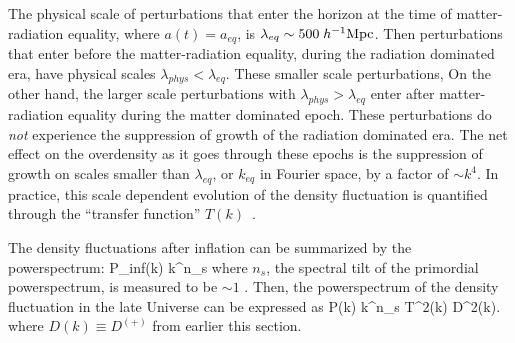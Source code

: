 The physical scale of perturbations that enter the horizon at the time of 
matter-radiation equality, where $a(t) = a_{eq}$, is $\lambda_{eq} \sim 500\;h^{-1}{\rm Mpc}$.
Then perturbations that enter before the matter-radiation equality, during 
the radiation dominated era, have physical scales $\lambda_{phys} < \lambda_{eq}$. 
These smaller scale perturbations,  
On the other hand, the larger scale perturbations with $\lambda_{phys} > \lambda_{eq}$
enter after matter-radiation equality during the matter dominated epoch. These 
perturbations do {\em not} experience the suppression of growth of the radiation 
dominated era. The net effect on the overdensity as it goes through these epochs 
is the suppression of growth on scales smaller than $\lambda_{eq}$, or $k_{eq}$ in 
Fourier space, by a factor of $\sim k^4$. In practice, this scale dependent 
evolution of the density fluctuation is quantified through the 
``transfer function'' $T(k)$~\citep{Eisenstein:1998aa, Eisenstein:1999aa}. 

The density fluctuations after inflation can be summarized by the powerspectrum: 
\beq
P_{\rm inf}(k) \propto k^{n_s}
\eeq
where $n_s$, the spectral tilt of the primordial powerspectrum, is measured to be 
$\sim 1$ \citep{Harrison:1970aa, Peebles:1970, Zeldovich:1972, Komatsu:2011aa}.
Then, the powerspectrum of the density fluctuation in the late Universe can be 
expressed as 
\beq
P(k) \propto k^{n_s} \; T^2(k) \; D^2(k).
\eeq
where $D(k) \equiv D^{(+)}$ from earlier this section. 

